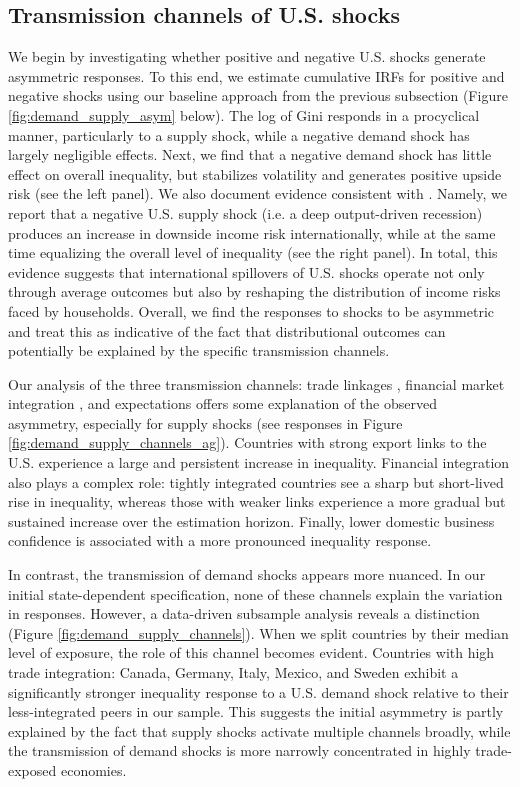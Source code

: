 \documentclass[12pt, a4paper]{article}
\begin{document}
\subsection{Transmission channels of U.S. shocks}
We begin by investigating whether positive and negative U.S. shocks generate asymmetric responses. To this end, we estimate cumulative IRFs for positive and negative shocks using our baseline approach from the previous subsection (Figure \ref{fig:demand_supply_asym} below). The log of Gini responds in a procyclical manner, particularly to a supply shock, while a negative demand shock has largely negligible effects. Next, we find that a negative demand shock has little effect on overall inequality, but stabilizes volatility and generates positive upside risk (see the left panel). We also document evidence consistent with \textcite{guvenen2014nature}. Namely, we report that a negative U.S. supply shock (i.e. a deep output-driven recession) produces an increase in downside income risk internationally, while at the same time equalizing the overall level of inequality (see the right panel). In total, this evidence suggests that international spillovers of U.S. shocks operate not only through average outcomes but also by reshaping the distribution of income risks faced by households. Overall, we find the responses to shocks to be asymmetric and treat this as indicative of the fact that distributional outcomes can potentially be explained by the specific transmission channels.

Our analysis of the three transmission channels: trade linkages \parencite{corsetti2011multilateral}, financial market integration \parencite{faccini2016international}, and expectations \parencite{klein2021real} offers some explanation of the observed asymmetry, especially for supply shocks (see responses in Figure \ref{fig:demand_supply_channels_ag}). Countries with strong export links to the U.S. experience a large and persistent increase in inequality. Financial integration also plays a complex role: tightly integrated countries see a sharp but short-lived rise in inequality, whereas those with weaker links experience a more gradual but sustained increase over the estimation horizon. Finally, lower domestic business confidence is associated with a more pronounced inequality response.

In contrast, the transmission of demand shocks appears more nuanced. In our initial state-dependent specification, none of these channels explain the variation in responses. However, a data-driven subsample analysis reveals a distinction (Figure \ref{fig:demand_supply_channels}). When we split countries by their median level of exposure, the role of this channel becomes evident. Countries with high trade integration: Canada, Germany, Italy, Mexico, and Sweden exhibit a significantly stronger inequality response to a U.S. demand shock relative to their less-integrated peers in our sample. This suggests the initial asymmetry is partly explained by the fact that supply shocks activate multiple channels broadly, while the transmission of demand shocks is more narrowly concentrated in highly trade-exposed economies.
\end{document}

